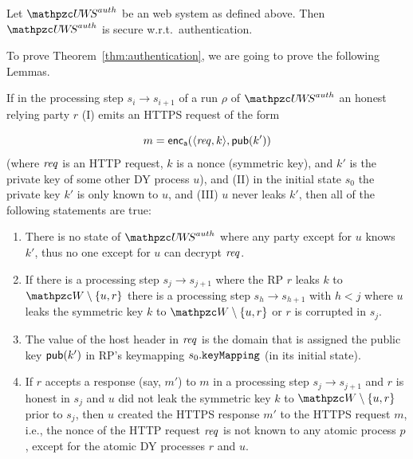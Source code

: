   \begin{theorem}\label{thm:authentication}
    Let $\uppressoauthwebsystem$ be an \uppresso web system as
    defined above. Then $\uppressoauthwebsystem$ is secure
    w.r.t.~authentication.
  \end{theorem}
  
  To prove Theorem~\ref{thm:authentication}, we are going to prove the following Lemmas.
  
  \begin{lemma}\label{lemma:k-does-not-leak-from-honest-rp} 
    If in the processing step $s_i \rightarrow s_{i+1}$ of a run $\rho$
    of $\uppressoauthwebsystem$ an honest relying party $r$ (I) emits an HTTPS
    request of the form
  
    \[ m = \mathsf{enc}_\mathsf{a}(\langle\mathit{req}, k\rangle,\mathsf{pub}(k')) \]
    (where $\mathit{req}$ is an HTTP request, $k$ is a nonce (symmetric
    key), and $k'$ is the private key of some other DY process $u$), and (II) in the
    initial state $s_0$ the private key $k'$ is only known to $u$, and
    (III) $u$ never leaks $k'$, then all of the following
    statements are true:
    \begin{enumerate}
    \item There is no state of $\uppressoauthwebsystem$ where any party except
      for $u$ knows $k'$, thus no one except for $u$ can
      decrypt $\mathit{req}$.
      \label{prop:attacker-cannot-decrypt-spresso}
    \item If there is a processing step $s_j \rightarrow s_{j+1}$ where
      the RP $r$ leaks $k$ to $\bidsystem \setminus \{u, r\}$ there
      is a processing step $s_h \rightarrow s_{h+1}$ with $h < j$
      where $u$ leaks the symmetric key $k$ to $\bidsystem \setminus
      \{u,r\}$ or $r$ is corrupted in
      $s_j$. \label{prop:k-doesnt-leak-spresso}
    \item The value of the host header in $\mathit{req}$ is the domain that
      is assigned the public key $\mathsf{pub}(k')$ in RP's keymapping
      $s_0.\mathtt{keyMapping}$ (in its initial
      state). \label{prop:host-header-matches-spresso}
    \item If $r$ accepts a response (say, $m'$) to $m$ in a processing step $s_j
      \rightarrow s_{j+1}$ and $r$ is honest in $s_j$ and $u$ did not
      leak the symmetric key $k$ to $\bidsystem \setminus \{u,r\}$ prior
      to $s_j$, then $u$ created the HTTPS response $m'$ to the HTTPS
      request $m$, i.e., the nonce of the HTTP request $\mathit{req}$ is not known to
      any atomic process $p$, except for the atomic DY processes $r$ and
      $u$.\label{prop:only-owner-answers-spresso}
    \end{enumerate}
  \end{lemma}
  
